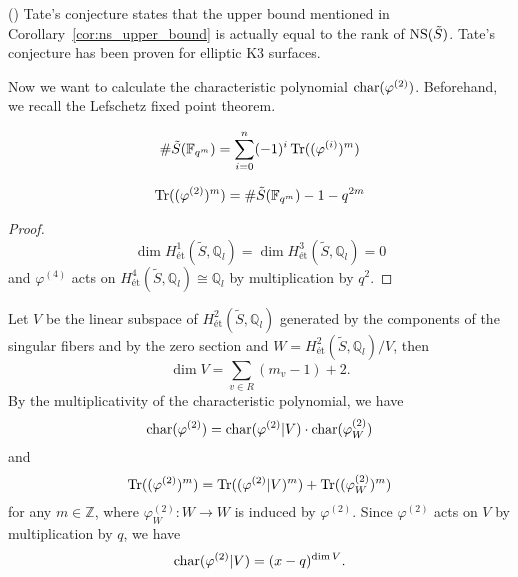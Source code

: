 \documentclass[main]{subfiles}
\begin{document}
\begin{rem}{(\cite[Remark 6.5.]{ref:vanluijk2007})}
    Tate's conjecture states that the upper bound mentioned in Corollary~\ref{cor:ns_upper_bound} is actually equal to the rank of $\operatorname{NS} (\tilde{S})$.
    Tate's conjecture has been proven for elliptic K3 surfaces.
\end{rem}

Now we want to calculate the characteristic polynomial $\operatorname{char} (\varphi^{(2)})$.
Beforehand, we recall the Lefschetz fixed point theorem.

\begin{thm}
    \begin{equation*}
        \# \tilde{S}(\mathbb{F}_{q^{m}}) = \sum_{i = 0}^{n} ( - 1)^{i} \operatorname{Tr}((\varphi^{(i)})^{m})
    \end{equation*}
\end{thm}

\begin{cor}
    \label{cor:lefschetz}
    \begin{equation*}
        \operatorname{Tr} ((\varphi^{(2)})^{m}) = \# \tilde{S}(\mathbb{F}_{q^{m}}) - 1 - q^{2m}
    \end{equation*}
\end{cor}
\begin{proof}
    \begin{equation*}
        \dim H_{\text{\'et}}^{1}(\tilde{S}, \mathbb{Q}_{l}) = \dim H_{\text{\'et}}^{3}(\tilde{S}, \mathbb{Q}_{l}) = 0
    \end{equation*}
    and $\varphi^{(4)}$ acts on $H_{\text{\'et}}^{4}(\tilde{S}, \mathbb{Q}_l) \cong \mathbb{Q}_l$ by multiplication by $q^{2}$.
\end{proof}

Let $V$ be the linear subspace of $H_{\text{\'et}}^{2}(\tilde{S}, \mathbb{Q}_{l})$ generated by the components of the singular fibers and by the zero section and $W = H_{\text{\'et}}^{2}(\tilde{S}, \mathbb{Q}_l) / V$, then
\begin{equation*}
    \dim V = \sum_{v \in R} (m_{v} - 1) + 2.
\end{equation*}
By the multiplicativity of the characteristic polynomial, we have
\begin{equation*}
    \operatorname{char} (\varphi^{(2)}) = \operatorname{char} (\varphi^{(2)} | V) \cdot \operatorname{char} (\varphi^{(2)}_{W})
\end{equation*}
and
\begin{equation}
    \operatorname{Tr} ((\varphi^{(2)})^{m}) = \operatorname{Tr} ((\varphi^{(2)} | V)^{m}) + \operatorname{Tr} ((\varphi^{(2)}_{W})^{m}) \label{eq:trcomposition}
\end{equation}
for any $m \in \mathbb{Z}$, where $\varphi^{(2)}_W: W \to W$ is induced by $\varphi^{(2)}$.
Since $\varphi^{(2)}$ acts on $V$ by multiplication by $q$, we have
\begin{equation*}
    \operatorname{char} (\varphi^{(2)} | V) = (x - q)^{\dim V}.
\end{equation*}
\end{document}

